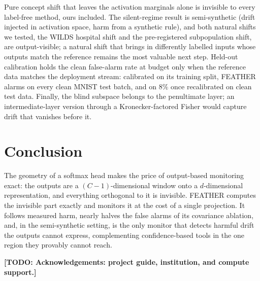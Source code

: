 \documentclass[graybox]{SNmult}
\newcommand{\todo}[1]{\textbf{[TODO: #1]}}
\begin{document}
Pure concept shift that leaves the activation marginals alone is invisible to
every label-free method, ours included. The
silent-regime result is semi-synthetic (drift injected in activation space,
harm from a synthetic rule), and both natural shifts we tested, the WILDS hospital shift and the
pre-registered subpopulation shift, are output-visible; a natural shift that
brings in differently labelled inputs whose outputs match the reference
remains the most valuable next step. Held-out calibration holds the clean
false-alarm rate at budget only when the reference data matches the deployment
stream: calibrated on its training split, FEATHER alarms on every clean MNIST
test batch, and on $8\%$ once recalibrated on clean test data.
Finally, the blind subspace belongs to the penultimate layer; an
intermediate-layer version through a Kronecker-factored Fisher
\cite{martens2015kfac} would capture drift that vanishes before it.

\section{Conclusion}
\label{sec:conclusion}

The geometry of a softmax head makes the price of output-based monitoring
exact: the outputs are a $(C-1)$-dimensional window onto a $d$-dimensional
representation, and everything orthogonal to it is invisible. FEATHER computes
the invisible part exactly and monitors it at the cost of a single projection. It
follows measured harm, nearly halves the false alarms of its covariance
ablation, and, in the semi-synthetic setting, is the only monitor that detects
harmful drift the outputs cannot express, complementing confidence-based tools in the one region they provably
cannot reach.

\begin{acknowledgement}
\todo{Acknowledgements: project guide, institution, and compute support.}
\end{acknowledgement}




\end{document}
